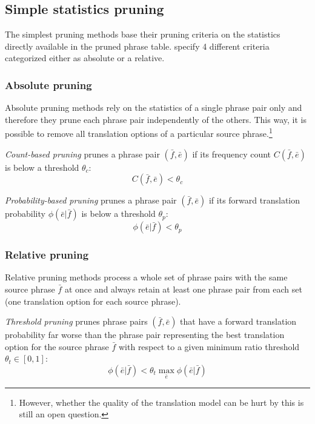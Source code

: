 \subsection{Simple statistics pruning}
\label{sec:simple-statistics-pruning}

The simplest pruning methods base their pruning criteria on the statistics directly
available in the pruned phrase table. \citet{zens:systcomp} specify 4 different criteria
categorized either as absolute or a relative.

\subsubsection*{Absolute pruning}

Absolute pruning methods rely on the statistics of a single phrase pair only and therefore
they prune each phrase pair independently of the others.
This way, it is possible to remove all translation options of a particular source
phrase.\footnote{However, whether the quality of the translation model can be hurt by this is
still an open question.}

\emph{Count-based pruning} prunes a phrase pair $(\bar{f},\bar{e})$ if its frequency count
$C(\bar{f},\bar{e})$ is below a threshold $\theta_{c}$:
\begin{equation} \label{eq:count-based-pruning}
  C(\bar{f},\bar{e}) < \theta_{c}
\end{equation}

\emph{Probability-based pruning} prunes a phrase pair $(\bar{f},\bar{e})$ if its forward
translation probability $\phi(\bar{e}|\bar{f})$ is below a threshold $\theta_{p}$:
\begin{equation}
  \phi(\bar{e}|\bar{f}) < \theta_{p}
\end{equation}

\subsubsection*{Relative pruning}

Relative pruning methods process a whole set of phrase pairs with the same source phrase
$\bar{f}$ at once and always retain at least one phrase pair from each set (one translation
option for each source phrase).

\emph{Threshold pruning} prunes phrase pairs $(\bar{f},\bar{e})$ that have a forward translation
probability far worse than the phrase pair representing the best translation option for the source
phrase $\bar{f}$ with respect to a given minimum ratio threshold $\theta_{t} \in [0,1]$:
\begin{equation}
  \phi(\bar{e}|\bar{f}) < \theta_{t} \max_{\bar{e}}{\phi(\bar{e}|\bar{f})}
\end{equation}

